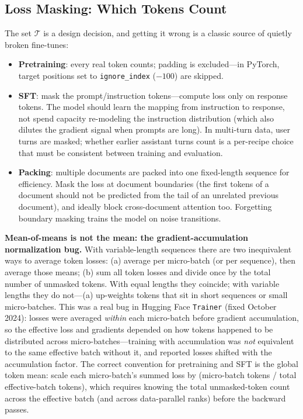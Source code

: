 \subsection{Loss Masking: Which Tokens Count}

The set $\mathcal{T}$ is a design decision, and getting it wrong is a classic source of quietly broken fine-tunes:

\begin{itemize}
    \item \textbf{Pretraining}: every real token counts; padding is excluded---in PyTorch, target positions set to \texttt{ignore\_index} ($-100$) are skipped.
    \item \textbf{SFT}: mask the prompt/instruction tokens---compute loss only on response tokens. The model should learn the mapping from instruction to response, not spend capacity re-modeling the instruction distribution (which also dilutes the gradient signal when prompts are long). In multi-turn data, user turns are masked; whether earlier assistant turns count is a per-recipe choice that must be consistent between training and evaluation.
    \item \textbf{Packing}: multiple documents are packed into one fixed-length sequence for efficiency. Mask the loss at document boundaries (the first tokens of a document should not be predicted from the tail of an unrelated previous document), and ideally block cross-document attention too. Forgetting boundary masking trains the model on noise transitions.
\end{itemize}

\begin{warningbox}
\textbf{Mean-of-means is not the mean: the gradient-accumulation normalization bug.} With variable-length sequences there are two inequivalent ways to average token losses: (a) average per micro-batch (or per sequence), then average those means; (b) sum all token losses and divide once by the total number of unmasked tokens. With equal lengths they coincide; with variable lengths they do not---(a) up-weights tokens that sit in short sequences or small micro-batches. This was a real bug in Hugging Face \texttt{Trainer} (fixed October 2024): losses were averaged \textit{within} each micro-batch before gradient accumulation, so the effective loss and gradients depended on how tokens happened to be distributed across micro-batches---training with accumulation was \textit{not} equivalent to the same effective batch without it, and reported losses shifted with the accumulation factor. The correct convention for pretraining and SFT is the global token mean: scale each micro-batch's summed loss by (micro-batch tokens / total effective-batch tokens), which requires knowing the total unmasked-token count across the effective batch (and across data-parallel ranks) before the backward passes.
\end{warningbox}

